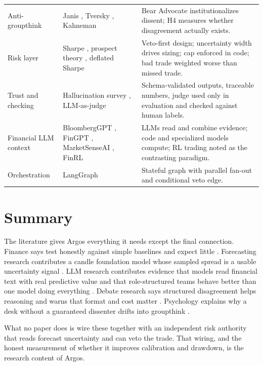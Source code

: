\documentclass[conference]{IEEEtran}
\newcommand{\sys}{Argos}
\begin{document}
\begin{table}[!t]
\begin{tabularx}{\columnwidth}{L{2.0cm} L{2.3cm} X}
\addlinespace[2pt]
Anti-groupthink & Janis \cite{janis1972groupthink}, Tversky \cite{tversky1974judgment}, Kahneman \cite{kahneman1979prospect} & Bear Advocate institutionalizes dissent; H4 measures whether disagreement actually exists. \\
\addlinespace[2pt]
Risk layer & Sharpe \cite{sharpe1994sharpe}, prospect theory \cite{kahneman1979prospect}, deflated Sharpe \cite{bailey2014deflated} & Veto-first design; uncertainty width drives sizing; cap enforced in code; bad trade weighted worse than missed trade. \\
\addlinespace[2pt]
Trust and checking & Hallucination survey \cite{ji2023hallucination}, LLM-as-judge \cite{zheng2023judging} & Schema-validated outputs, traceable numbers, judge used only in evaluation and checked against human labels. \\
\addlinespace[2pt]
Financial LLM context & BloombergGPT \cite{wu2023bloomberggpt}, FinGPT \cite{yang2023fingpt}, MarketSenseAI \cite{fatouros2024marketsenseai}, FinRL \cite{liu2023finrl} & LLMs read and combine evidence; code and specialized models compute; RL trading noted as the contrasting paradigm. \\
\addlinespace[2pt]
Orchestration & LangGraph \cite{langgraph2024} & Stateful graph with parallel fan-out and conditional veto edge. \\
\bottomrule
\end{tabularx}
\end{table}

\section{Summary}

The literature gives \sys{} everything it needs except the final connection. Finance says test honestly against simple baselines and expect little \cite{fama1970efficient,lopezdeprado2018advances}. Forecasting research contributes a candle foundation model whose sampled spread is a usable uncertainty signal \cite{shi2025kronos}. LLM research contributes evidence that models read financial text with real predictive value \cite{lopezlira2023chatgpt} and that role-structured teams behave better than one model doing everything \cite{xiao2024tradingagents,guo2024llmmultiagents}. Debate research says structured disagreement helps reasoning and warns that format and cost matter \cite{du2023debate,smit2024mad}. Psychology explains why a desk without a guaranteed dissenter drifts into groupthink \cite{janis1972groupthink}.

What no paper does is wire these together with an independent risk authority that reads forecast uncertainty and can veto the trade. That wiring, and the honest measurement of whether it improves calibration and drawdown, is the research content of \sys{}.



\end{document}

